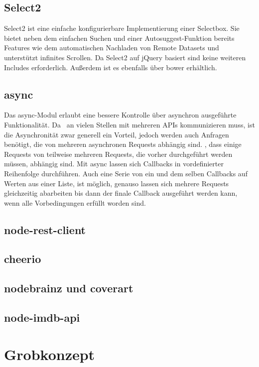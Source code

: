 \subsection{Select2}
Select2 ist eine einfache konfigurierbare Implementierung einer Selectbox. Sie bietet neben dem einfachen Suchen und einer Autosuggest-Funktion bereits Features wie dem automatischen Nachladen von Remote Datasets und unterstützt infinites Scrollen. Da Select2 auf jQuery basiert sind keine weiteren Includes erforderlich. Außerdem ist es ebenfalls über bower erhältlich.

\subsection{async}
Das async-Modul erlaubt eine bessere Kontrolle über asynchron ausgeführte Funktionalität. Da \arbeitstitel \ an vielen Stellen mit mehreren APIs kommunizieren muss, ist die Asynchronität zwar generell ein Vorteil, jedoch werden auch Anfragen benötigt, die von mehreren asynchronen Requests abhängig sind. \Dahe , dass einige Requests von teilweise mehreren Requests, die vorher durchgeführt werden müssen, abhängig sind. Mit async lassen sich Callbacks in vordefinierter Reihenfolge durchführen. Auch eine Serie von ein und dem selben Callbacks auf Werten aus einer Liste, ist möglich, genauso lassen sich mehrere Requests gleichzeitig abarbeiten bis dann der finale Callback ausgeführt werden kann, wenn alle Vorbedingungen erfüllt worden sind.  

\subsection{node-rest-client}


\subsection{cheerio}
\subsection{nodebrainz und coverart}

\subsection{node-imdb-api}


\section{Grobkonzept}


